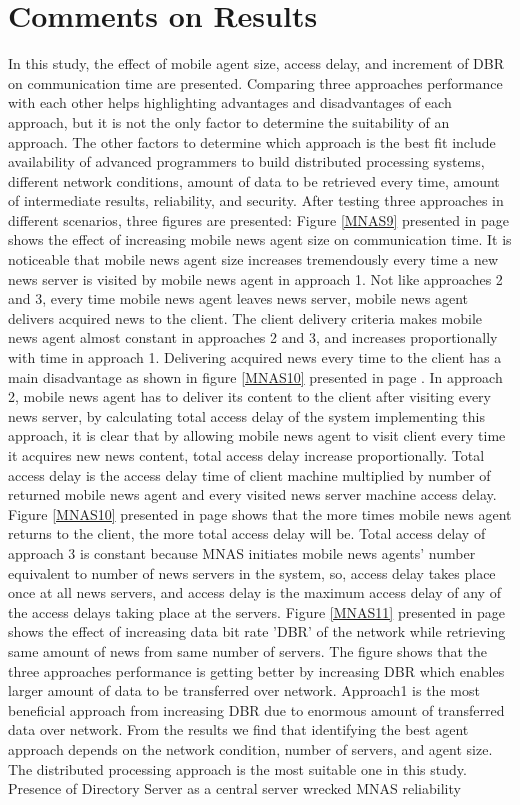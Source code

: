 \documentclass[12pt,a4paper,final,twoside,onecolumn,titlepage]{book}
\begin{document}
\section{Comments on Results}
In this study, the effect of mobile agent size, access delay, and increment of DBR on communication time are presented. Comparing three approaches performance with each other helps highlighting advantages and disadvantages of each approach, but it is not the only factor to determine the suitability of an approach. The other factors to determine which approach is the best fit include availability of advanced programmers to build distributed processing systems, different network conditions, amount of data to be retrieved every time, amount of intermediate results, reliability, and security. After testing three approaches in different scenarios, three figures are presented: Figure \ref{MNAS9} presented in page \pageref{MNAS9} shows the effect of increasing mobile news agent size on communication time. It is noticeable that mobile news agent size increases tremendously every time a new news server is visited by mobile news agent in approach 1. Not like approaches 2 and 3, every time mobile news agent leaves news server, mobile news agent delivers acquired news to the client. The client delivery criteria makes mobile news agent almost constant in approaches 2 and 3, and increases proportionally with time in approach 1. Delivering acquired news every time to the client has a main disadvantage as shown in figure \ref{MNAS10} presented in page \pageref{MNAS10}. In approach 2, mobile news agent has to deliver its content to the client after visiting every news server, by calculating total access delay of the system implementing this approach, it is clear that by allowing mobile news agent to visit client every time it acquires new news content, total access delay increase proportionally. Total access delay is the access delay time of client machine multiplied by number of returned mobile news agent and every visited news server machine access delay. Figure \ref{MNAS10} presented in page \pageref{MNAS10} shows that the more times mobile news agent returns to the client, the more total access delay will be. Total access delay of approach 3 is constant because \gls{MNAS} initiates mobile news agents' number equivalent to number of news servers in the system, so, access delay takes place once at all news servers, and access delay is the maximum access delay of any of the access delays taking place at the servers. Figure \ref{MNAS11} presented in page \pageref{MNAS11} shows the effect of increasing data bit rate 'DBR' of the network while retrieving same amount of news from same number of servers. The figure shows that the three approaches performance is getting better by increasing DBR which enables larger amount of data to be transferred over network. Approach1 is the most beneficial approach from increasing DBR due to enormous amount of transferred data over network. From the results we find that identifying the best agent approach depends on the network condition, number of servers, and agent size. The distributed processing approach is the most suitable one in this study. Presence of Directory Server as a central server wrecked \gls{MNAS} reliability 
\end{document}
